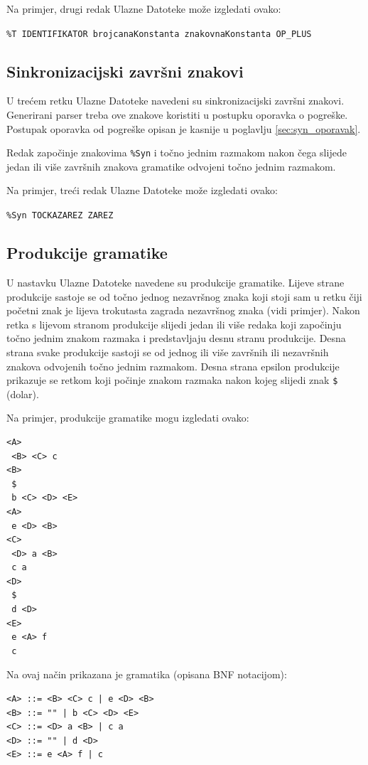 \documentclass[times, 12pt, utf8]{book}
\begin{document}
Na primjer, drugi redak Ulazne Datoteke može izgledati ovako:

\verb|%T IDENTIFIKATOR brojcanaKonstanta znakovnaKonstanta OP_PLUS|

\subsection{Sinkronizacijski završni znakovi}

U trećem retku Ulazne Datoteke navedeni su sinkronizacijski završni znakovi.
Generirani parser treba ove znakove koristiti u postupku oporavka o pogreške.
Postupak oporavka od pogreške opisan je kasnije u poglavlju \ref{sec:syn_oporavak}.

Redak započinje znakovima \verb|%Syn| i točno jednim razmakom nakon čega slijede jedan ili više završnih znakova gramatike odvojeni točno jednim razmakom.

Na primjer, treći redak Ulazne Datoteke može izgledati ovako:

\verb|%Syn TOCKAZAREZ ZAREZ|

\subsection{Produkcije gramatike}
U nastavku Ulazne Datoteke navedene su produkcije gramatike.
Lijeve strane produkcije sastoje se od točno jednog nezavršnog znaka koji stoji sam u retku čiji početni znak je lijeva trokutasta zagrada nezavršnog znaka (vidi primjer).
Nakon retka s lijevom stranom produkcije slijedi jedan ili više redaka koji započinju točno jednim znakom razmaka i predstavljaju desnu stranu produkcije.
Desna strana svake produkcije sastoji se od jednog ili više završnih ili nezavršnih znakova odvojenih točno jednim razmakom.
Desna strana epsilon produkcije prikazuje se retkom koji počinje znakom razmaka nakon kojeg slijedi znak \verb|$| (dolar).

Na primjer, produkcije gramatike mogu izgledati ovako:
\begin{lstlisting}[caption={Primjer produkcija gramatike.},label=lst:produkcije_gramatike_primjer]
<A>
 <B> <C> c
<B>
 $
 b <C> <D> <E>
<A>
 e <D> <B>
<C>
 <D> a <B>
 c a
<D>
 $
 d <D>
<E>
 e <A> f
 c
\end{lstlisting}

Na ovaj način prikazana je gramatika (opisana BNF notacijom):
\begin{lstlisting}[caption={Primjer produkcija gramatike u BNF notaciji.},label=lst:produkcije_gramatike_primjer_bnf]
<A> ::= <B> <C> c | e <D> <B>
<B> ::= "" | b <C> <D> <E>
<C> ::= <D> a <B> | c a
<D> ::= "" | d <D>
<E> ::= e <A> f | c
\end{lstlisting}
\end{document}
